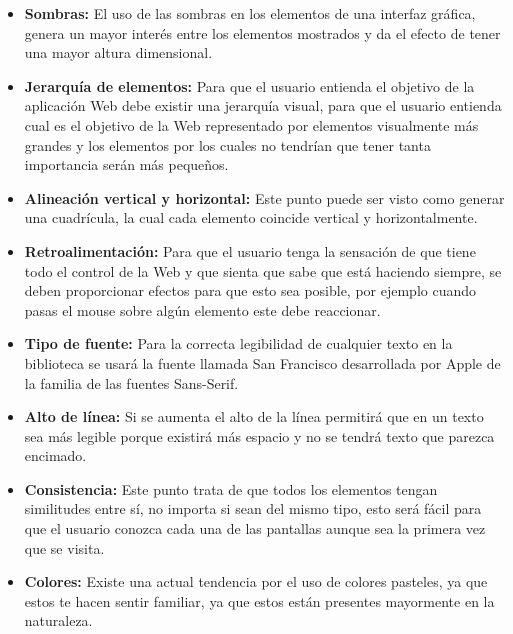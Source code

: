 \begin{itemize}
\item \textbf{Sombras:} El uso de las sombras en los elementos de una interfaz gráfica, genera un mayor interés entre los elementos mostrados y da el efecto de tener una mayor altura dimensional.
\item \textbf{Jerarquía de elementos:} Para que el usuario entienda el objetivo de la aplicación Web debe existir una jerarquía visual, para que el usuario entienda cual es el objetivo de la Web representado por elementos visualmente más grandes y los elementos por los cuales no tendrían que tener tanta importancia serán más pequeños.
\item \textbf{Alineación vertical y horizontal:} Este punto puede ser visto como generar una cuadrícula, la cual cada elemento coincide vertical y horizontalmente.
\item \textbf{Retroalimentación:} Para que el usuario tenga la sensación de que tiene todo el control de la Web y que sienta que sabe que está haciendo siempre, se deben proporcionar efectos para que esto sea posible, por ejemplo cuando pasas el mouse sobre algún elemento este debe reaccionar.
\item \textbf{Tipo de fuente:} Para la correcta legibilidad de cualquier texto en la biblioteca se usará la fuente llamada San Francisco desarrollada por Apple de la familia de las fuentes Sans-Serif.
\item \textbf{Alto de línea:} Si se aumenta el alto de la línea permitirá que en un texto sea más legible porque existirá más espacio y no se tendrá texto que parezca encimado.
\item \textbf{Consistencia:} Este punto trata de que todos los elementos tengan similitudes entre sí, no importa si sean del mismo tipo, esto será fácil para que el usuario conozca cada una de las pantallas aunque sea la primera vez que se visita. 
\item \textbf{Colores:} Existe una actual tendencia por el uso de colores pasteles, ya que estos te hacen sentir familiar, ya que estos están presentes mayormente en la naturaleza.
\end{itemize}
